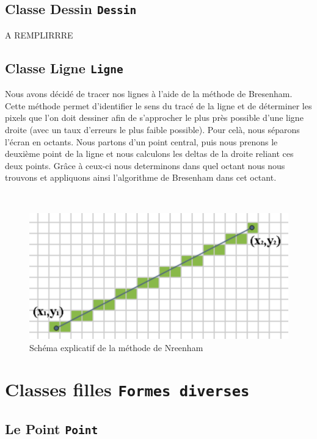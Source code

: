 \documentclass[11pt]{article}
\begin{document}
\subsection{Classe Dessin \texttt{Dessin}}

A REMPLIRRRE

\clearpage

\subsection{Classe Ligne \texttt{Ligne}}

Nous avons décidé de tracer nos lignes à l'aide de la méthode de Bresenham. Cette méthode permet d’identifier le sens du tracé de la ligne et de déterminer les pixels que l'on doit dessiner afin de s'approcher le plus près possible d'une ligne droite (avec un taux d'erreurs le plus faible possible). Pour celà, nous séparons l'écran en octants. Nous partons d'un point central, puis nous prenons le deuxième point de la ligne et nous calculons les deltas de la droite reliant ces deux points. Grâce à ceux-ci nous determinons dans quel octant nous nous trouvons et appliquons ainsi l'algorithme de Bresenham dans cet octant. 

\
\

\begin{figure}[!htbp]
    \begin{center}
        \includegraphics[width=13cm]{Photo3.png}
        \caption{Schéma explicatif de la méthode de Nreenham}
    \centering
    \end{center}
\end{figure}

\clearpage
\section{Classes filles \texttt{Formes diverses}}

\subsection{Le Point \texttt{Point}}
\end{document}
